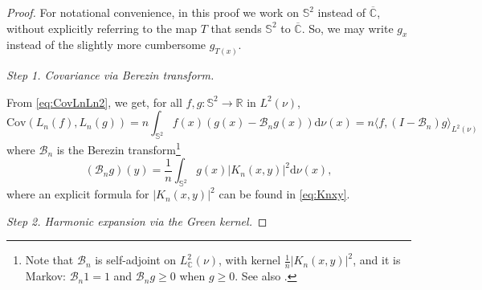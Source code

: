 \documentclass[10pt,reqno]{amsart}
\numberwithin{equation}{section}
\numberwithin{figure}{section}
\theoremstyle{plain}
\newcommand{\<}{\langle}
\renewcommand{\>}{\rangle}
\begin{document}
\begin{proof}
For notational convenience,
in this proof we work
on $\mathbb S^2$
instead of $\overline{\mathbb C}$,
without explicitly referring to the map $T$
that sends $\mathbb S^2$ to $\overline{\mathbb C}$.
So, we may write
$g_x$ instead of the slightly more cumbersome
$g_{T(x)}$. 

  \medskip

  \noindent\emph{Step 1. Covariance via Berezin transform.} 

  \medskip
  
    From \eqref{eq:CovLnLn2}, we get, for all $f,g:\mathbb{S}^2\to\mathbb{R}$ in  $L^2(\nu)$,
  \begin{equation}\label{eq:cov-berezin}
    \mathrm{Cov}(L_n(f),L_n(g))
    =n\int_{\mathbb{S}^2}f(x)(g(x)-\mathcal{B}_ng(x))\mathrm{d}\nu(x)
    =n\langle f,(I-\mathcal{B}_n)g\rangle_{L^2(\nu)}
  \end{equation}
  where $\mathcal{B}_n$ is the Berezin transform\footnote{Note that $\mathcal{B}_n$ is 
    self-adjoint on $L^2_{\mathbb{C}}(\nu)$, with kernel
    $\frac{1}{n}|K_n(x,y)|^2$, and it is Markov: $\mathcal{B}_n1=1$ and $\mathcal{B}_ng\geq0$ when $g\geq0$. See also \cite{MR3494849}.}
  \begin{equation}\label{eq:berezin}
    (\mathcal{B}_ng)(y)=\frac{1}{n}\int_{\mathbb{S}^2} g(x)|K_n(x,y)|^2\mathrm{d}\nu(x),
  \end{equation}
  where 
  an explicit formula for $|K_n(x,y)|^2$ can be found in \eqref{eq:Knxy}.

  \medskip

  \noindent\emph{Step 2. Harmonic expansion via the Green kernel.}

  \medskip
  

\end{proof}
\end{document}
